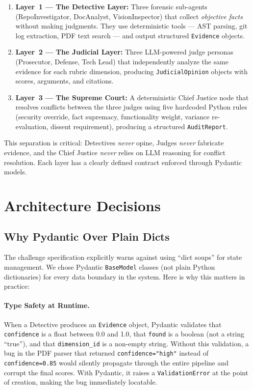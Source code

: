 \documentclass[12pt,a4paper]{article}
\begin{document}
\begin{enumerate}
  \item \textbf{Layer~1 --- The Detective Layer:} Three forensic sub-agents (RepoInvestigator, DocAnalyst, VisionInspector) that collect \emph{objective facts} without making judgments. They use deterministic tools --- AST parsing, git log extraction, PDF text search --- and output structured \texttt{Evidence} objects.
  \item \textbf{Layer~2 --- The Judicial Layer:} Three LLM-powered judge personas (Prosecutor, Defense, Tech Lead) that independently analyze the same evidence for each rubric dimension, producing \texttt{JudicialOpinion} objects with scores, arguments, and citations.
  \item \textbf{Layer~3 --- The Supreme Court:} A deterministic Chief Justice node that resolves conflicts between the three judges using five hardcoded Python rules (security override, fact supremacy, functionality weight, variance re-evaluation, dissent requirement), producing a structured \texttt{AuditReport}.
\end{enumerate}

This separation is critical: Detectives \emph{never} opine, Judges \emph{never} fabricate evidence, and the Chief Justice \emph{never} relies on LLM reasoning for conflict resolution. Each layer has a clearly defined contract enforced through Pydantic models.


\section{Architecture Decisions}

\subsection{Why Pydantic Over Plain Dicts}
\label{sec:pydantic}

The challenge specification explicitly warns against using ``dict soups'' for state management. We chose Pydantic \texttt{BaseModel} classes (not plain Python dictionaries) for every data boundary in the system. Here is why this matters in practice:

\paragraph{Type Safety at Runtime.}
When a Detective produces an \texttt{Evidence} object, Pydantic validates that \texttt{confidence} is a float between 0.0 and 1.0, that \texttt{found} is a boolean (not a string ``true''), and that \texttt{dimension\_id} is a non-empty string. Without this validation, a bug in the PDF parser that returned \texttt{confidence="high"} instead of \texttt{confidence=0.85} would silently propagate through the entire pipeline and corrupt the final scores. With Pydantic, it raises a \texttt{ValidationError} at the point of creation, making the bug immediately locatable.
\end{document}
